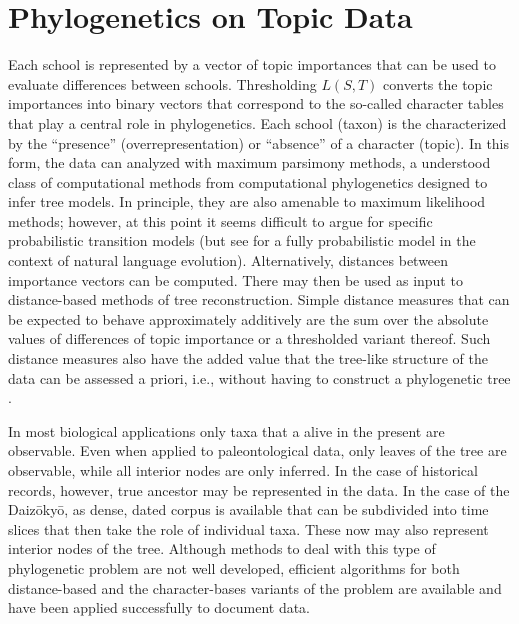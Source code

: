 \documentclass[a4paper,10pt]{article}
\newcommand{\TODO}[1]{\begingroup\color{red}#1\endgroup}
\begin{document}
\section{Phylogenetics on Topic Data} 

Each \TODO{school} is represented by a vector of topic importances that can
be used to evaluate differences between \TODO{schools}.  Thresholding
$L(S,T)$ converts the topic importances into binary vectors that correspond
to the so-called character tables that play a central role in
phylogenetics. Each \TODO{school} (taxon) is the characterized by the
``presence'' (overrepresentation) or ``absence'' of a character (topic).
In this form, the data can analyzed with maximum parsimony methods, a
understood class of computational methods from computational phylogenetics
designed to infer tree models. In principle, they are also amenable to
maximum likelihood methods; however, at this point it seems difficult to
argue for specific probabilistic transition models (but see
\cite{Hruschka:15} for a fully probabilistic model in the context of
natural language evolution). Alternatively, distances between importance
vectors can be computed. There may then be used as input to distance-based
methods of tree reconstruction. Simple distance measures that can be
expected to behave approximately additively are the sum over the absolute
values of differences of topic importance or a thresholded variant
thereof. Such distance measures also have the added value that the
tree-like structure of the data can be assessed a priori, i.e., without
having to construct a phylogenetic tree \cite{Misof:14}.

In most biological applications only taxa that a alive in the present are
observable. Even when applied to paleontological data, only leaves of the
tree are observable, while all interior nodes are only inferred. In the
case of historical records, however, true ancestor may be represented in
the data. In the case of the Daiz{\=o}ky{\=o}, as dense, dated corpus is
available that can be subdivided into time slices that then take the role
of individual taxa. These now may also represent interior nodes of the
tree. Although methods to deal with this type of phylogenetic problem are
not well developed, efficient algorithms for both distance-based and the
character-bases variants of the problem are available \cite{Telles:13} and
have been applied successfully to document data. 
\end{document}
